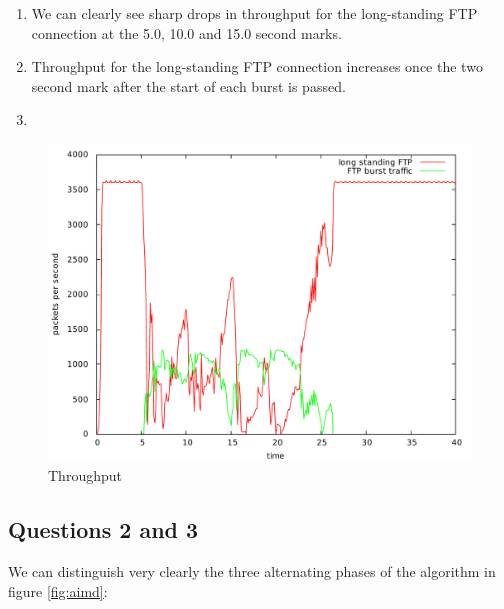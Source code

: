 \documentclass[10pt,a4paper]{article}
\begin{document}
\begin{enumerate}
\item We can clearly see sharp drops in throughput for the
long-standing FTP connection at the 5.0, 10.0 and 15.0 second marks. 
\item Throughput for the long-standing FTP connection increases once
the two second mark after the start of each burst is passed.
\item 
\end{enumerate}

\begin{figure}[p]
    \centering
    \includegraphics[width=\textwidth]{../part2/q1/plots/1.pdf}
    \caption{Throughput}
    \label{fig:burst_traffic}
\end{figure}


\subsection{Questions 2 and 3}

We can distinguish very clearly the three alternating phases of the
algorithm in figure \ref {fig:aimd}:
\end{document}
